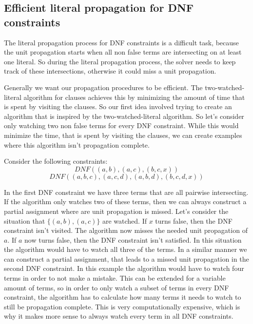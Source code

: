 \subsection{Efficient literal propagation for DNF constraints}

The literal propagation process for DNF constraints is a difficult task, because the unit propagation starts when all non false terms are intersecting on at least one literal. So during the literal propagation process, the solver needs to keep track of these intersections, otherwise it could miss a unit propagation. 

Generally we want our propagation procedures to be efficient. The two-watched-literal algorithm for clauses achieves this by minimizing the amount of time that is spent by visiting the clauses. So our first idea involved trying to create an algorithm that is inspired by the two-watched-literal algorithm. So let's consider only watching two non false terms for every DNF constraint. While this would minimize the time, that is spent by visiting the clauses, we can create examples where this algorithm isn't propagation complete.

\begin{leftbar}
Consider the following constraints:
\begin{displaymath}
DNF ((a,b),(a,c),(b,c,x))
\end{displaymath}
\begin{displaymath}
DNF ((a,b,c),(a,c,d),(a,b,d),(b,c,d,x))
\end{displaymath}
\end{leftbar}

In the first DNF constraint we have three terms that are all pairwise intersecting. If the algorithm only watches two of these terms, then we can always construct a partial assignment where are unit propagation is missed. Let's consider the situation that $\{(a,b),(a,c)\}$ are watched. If $x$ turns false, then the DNF constraint isn't visited. The algorithm now misses the needed unit propagation of $a$. If $a$ now turns false, then the DNF constraint isn't satisfied. In this situation the algorithm would have to watch all three of the terms.
In a similar manner we can construct a partial assignment, that leads to a missed unit propagation in the second DNF constraint. In this example the algorithm would have to watch four terms in order to not make a mistake. This can be extended for a variable amount of terms, so in order to only watch a subset of terms in every DNF constraint, the algorithm has to calculate how many terms it needs to watch to still be propagation complete. This is very computationally expensive, which is why it makes more sense to always watch every term in all DNF constraints.

